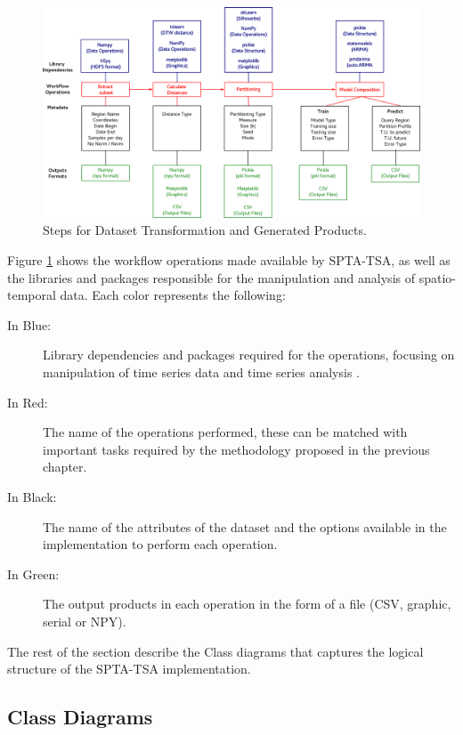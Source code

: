 \begin{figure}[tp]
	\centering
	\includegraphics[scale=0.25, angle=90]{../Figures/workflow_data_operations}
	\caption{Steps for Dataset Transformation and Generated Products.}	
	\label{Fig:Steps-Data-Transformation}	 		
\end{figure}

Figure \ref{Fig:Steps-Data-Transformation} shows the workflow operations made available by SPTA-TSA, as well as the libraries and packages responsible for the manipulation and analysis of spatio-temporal data. Each color represents the following:

\begin{description}
    \item[In Blue:] Library dependencies and packages required for the operations, focusing on manipulation of time series data and time series analysis .
    \item[In Red:] The name of the operations performed, these can be matched with important tasks required by the methodology proposed in the previous chapter.
    \item[In Black:] The name of the attributes of the dataset and the options available in the implementation to perform each operation.
    \item[In Green:] The output products in each operation in the form of a file (CSV, graphic, serial or NPY).
\end{description}

The rest of the section describe the Class diagrams that captures the logical structure of the SPTA-TSA implementation.

\subsection{Class Diagrams}
\label{Sec:SPT-TSAClassDiagrams}

